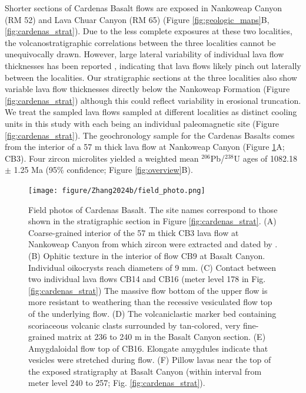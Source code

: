 Shorter sections of Cardenas Basalt flows are exposed in Nankoweap Canyon (RM 52) and Lava Chuar Canyon (RM 65) (Figure \ref{fig:geologic_maps}B, \ref{fig:cardenas_strat}). Due to the less complete exposures at these two localities, the volcanostratigraphic correlations between the three localities cannot be unequivocally drawn. However, large lateral variability of individual lava flow thicknesses has been reported \citep{Lucchitta1983a}, indicating that lava flows likely pinch out laterally between the localities. Our stratigraphic sections at the three localities also show variable lava flow thicknesses directly below the Nankoweap Formation (Figure \ref{fig:cardenas_strat}) although this could reflect variability in erosional truncation. We treat the sampled lava flows sampled at different localities as distinct cooling units in this study with each being an individual paleomagnetic site (Figure \ref{fig:cardenas_strat}). The \cite{Mohr2024a} geochronology sample for the Cardenas Basalts comes from the interior of a 57 m thick lava flow at Nankoweap Canyon (Figure \ref{fig:field_photo}A; CB3). Four zircon microlites yielded a weighted mean $^{206}$Pb/$^{238}$U ages of 1082.18 $\pm$ 1.25 Ma (95\% confidence; Figure \ref{fig:overview}B). 

\begin{figure}[h!]
\centering
\texttt{[image: figure/Zhang2024b/field\_photo.png]}
\caption{Field photos of Cardenas Basalt. The site names correspond to those shown in the stratigraphic section in Figure \ref{fig:cardenas_strat}. (A) Coarse-grained interior of the 57 m thick CB3 lava flow at Nankoweap Canyon from which zircon were extracted and dated by \cite{Mohr2024a}. (B) Ophitic texture in the interior of flow CB9 at Basalt Canyon. Individual oikocrysts reach diameters of 9 mm. (C) Contact between two individual lava flows CB14 and CB16 (meter level 178 in Fig. \ref{fig:cardenas_strat}) The massive flow bottom of the upper flow is more resistant to weathering than the recessive vesiculated flow top of the underlying flow. (D) The volcaniclastic marker bed containing scoriaceous volcanic clasts surrounded by tan-colored, very fine-grained matrix at 236 to 240 m in the Basalt Canyon section. (E) Amygdaloidal flow top of CB16. Elongate amygdules indicate that vesicles were stretched during flow. (F) Pillow lavas near the top of the exposed stratigraphy at Basalt Canyon (within interval from meter level 240 to 257; Fig. \ref{fig:cardenas_strat}). }
\label{fig:field_photo}
\end{figure}

